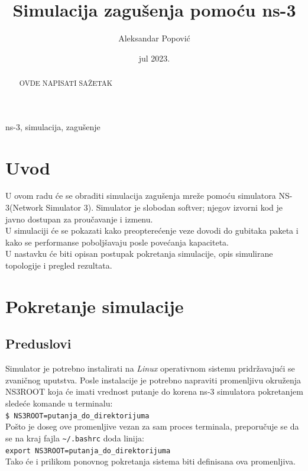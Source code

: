 \documentclass[a4paper, 12pt, projekat]{etf}
\title{Simulacija zagušenja pomoću ns-3}
\author{Aleksandar Popović}
\date{jul 2023.}
\begin{document}
	\maketitle
	\begin{abstract}
		OVDE NAPISATI SA\v{Z}ETAK 
	\end{abstract}
	\begin{keywords}
		ns-3, simulacija, zagu\v{s}enje
	\end{keywords}
	\tableofcontents
	\listoffigures
	\listoftables
	
	\chapter{Uvod}
	U ovom radu će se obraditi simulacija zagušenja mreže pomoću simulatora NS-3(Network Simulator 3). 
	Simulator je slobodan softver; njegov izvorni kod je javno dostupan za proučavanje i izmenu.\\
	U simulaciji će se pokazati kako preopterećenje veze dovodi do gubitaka paketa i kako se performanse poboljšavaju posle povećanja kapaciteta.\\
	U nastavku će biti opisan postupak pokretanja simulacije, opis simulirane topologije i pregled rezultata.
	
	\chapter{Pokretanje simulacije}
	\section{Preduslovi}
	Simulator je potrebno instalirati na \emph{Linux} operativnom sistemu pridržavajući se zvaničnog uputstva. \cite{ns3man} Posle instalacije je potrebno napraviti promenljivu okruženja NS3ROOT koja će imati vrednost putanje do korena ns-3 simulatora pokretanjem sledeće komande u terminalu:\\
	
	\verb|$ NS3ROOT=putanja_do_direktorijuma|\\
	
	Pošto je doseg ove promenljive vezan za sam proces terminala, preporučuje se da se na kraj fajla \verb|~/.bashrc| doda linija:\\
	
	\verb|export NS3ROOT=putanja_do_direktorijuma|\\
	
	Tako će i prilikom ponovnog pokretanja sistema biti definisana ova promenljiva.
	
\end{document}

